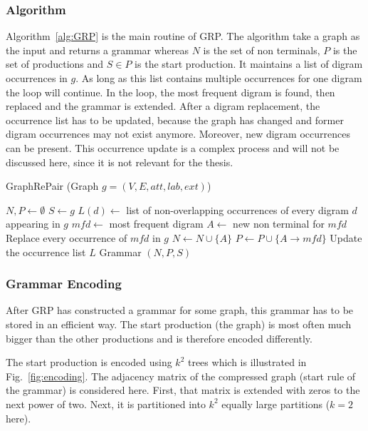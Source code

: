 \subsubsection{Algorithm}

Algorithm~\ref{alg:GRP} is the main routine of GRP. The algorithm take a graph as the input and returns a grammar whereas $N$ is the set of non terminals, $P$ is the set of productions and $S \in P$ is the start production. It maintains a list of digram occurrences in $g$. As long as this list contains multiple occurrences for one digram the loop will continue. In the loop, the most frequent digram is found, then replaced and the grammar is extended. After a digram replacement, the occurrence list has to be updated, because the graph has changed and former digram occurrences may not exist anymore. Moreover, new digram occurrences can be present. This occurrence update is a complex process and will not be discussed here, since it is not relevant for the thesis.~\cite{maneth}

\begin{algorithm}
	\caption{GraphRePair (Graph $g=(V,E,att,lab,ext)$)}\label{alg:GRP}
	\begin{algorithmic}[1]
		\State $ N,P\leftarrow \emptyset$
		\State $S \leftarrow g$
		\State $L(d) \leftarrow $ list of non-overlapping occurrences of every digram $d$ appearing in $g$
			\State $mfd \leftarrow$ most frequent digram
			\State $A \leftarrow$ new non terminal for $mfd$
			\State Replace every occurrence of $mfd$ in $g$
			\State $N \leftarrow N \cup \{A\}$
			\State $P\leftarrow P\cup \{A \to mfd \}$
			\State Update the occurrence list $L$
		\EndWhile
		\State \Return Grammar $(N,P,S)$
	\end{algorithmic}
\end{algorithm}


\subsubsection{Grammar Encoding}\label{sec:related_workGrammarEncoding}

After GRP has constructed a grammar for some graph, this grammar has to be stored in an efficient way. The start production (the graph) is most often much bigger than the other productions and is therefore encoded differently. 

The start production is encoded using $k^2$ trees which is illustrated in Fig.~\ref{fig:encoding}. The adjacency matrix of the compressed graph (start rule of the grammar) is considered here. First, that matrix is extended with zeros to the next power of two. Next, it is partitioned into $k^2$ equally large partitions ($k=2$ here).

